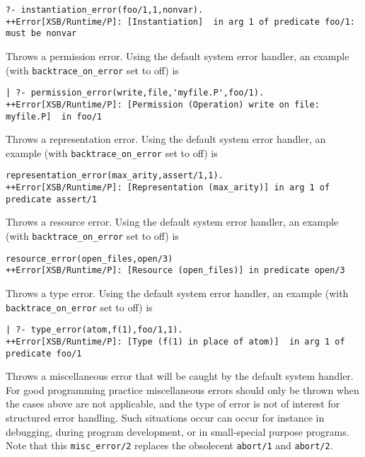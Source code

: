 \begin{description}
{\begin{verbatim}
?- instantiation_error(foo/1,1,nonvar).
++Error[XSB/Runtime/P]: [Instantiation]  in arg 1 of predicate foo/1: must be nonvar
\end{verbatim}
}
%
Throws a permission error.  Using the default system error
handler, an example (with {\tt backtrace\_on\_error} set to off) is 
{\small 
\begin{verbatim}
| ?- permission_error(write,file,'myfile.P',foo/1).
++Error[XSB/Runtime/P]: [Permission (Operation) write on file: myfile.P]  in foo/1
\end{verbatim}
}
%
Throws a representation error.  Using the default system error handler, an
example (with {\tt backtrace\_on\_error} set to off) is {\small
\begin{verbatim}
representation_error(max_arity,assert/1,1).
++Error[XSB/Runtime/P]: [Representation (max_arity)] in arg 1 of predicate assert/1
\end{verbatim} }
%
Throws a resource error.  Using the default system error handler, an
example (with {\tt backtrace\_on\_error} set to off) is {\small
\begin{verbatim}
resource_error(open_files,open/3)
++Error[XSB/Runtime/P]: [Resource (open_files)] in predicate open/3
\end{verbatim} }
%
Throws a type error.  Using the default system error
handler, an example (with {\tt backtrace\_on\_error} set to off) is 
{\small 
\begin{verbatim}
| ?- type_error(atom,f(1),foo/1,1).
++Error[XSB/Runtime/P]: [Type (f(1) in place of atom)]  in arg 1 of predicate foo/1
\end{verbatim}
}
%
 Throws a miscellaneous error that will
be caught by the default system handler.  For good programming
practice miscellaneous errors should only be thrown when the cases
above are not applicable, and the type of error is not of interest for
structured error handling.  Such situations occur can occur for
instance in debugging, during program development, or in small-special
purpose programs.  Note that this {\tt misc\_error/2} replaces the
obsolecent {\tt abort/1} and {\tt abort/2}.
%
\end{description}
